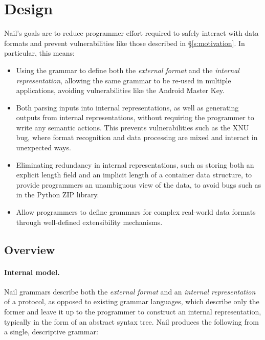 \section{Design}
\label{s:design}

Nail's goals are to reduce programmer effort required to safely interact with data formats and
prevent vulnerabilities like those described in \S\ref{s:motivation}. In particular, this means:

\begin{itemize}


\item Using the grammar to define both the \emph{external format} and the \emph{internal
    representation}, allowing the same grammar to be re-used in multiple applications, avoiding
  vulnerabilities like the Android Master Key.

\item Both parsing inputs into internal representations, as well as
      generating outputs from internal representations, without
      requiring the programmer to write any semantic actions. This prevents
      vulnerabilities such as the XNU bug, where format recognition and data processing
      are mixed and interact in unexpected ways.

\item Eliminating redundancy in internal representations, such as
      storing both an explicit length field and an implicit length
      of a container data structure, to provide programmers
      an unambiguous view of the data, to avoid bugs such as in the Python ZIP library.

\item Allow programmers to define grammars for complex real-world
      data formats through well-defined extensibility mechanisms. 

\end{itemize}

\subsection{Overview}

\paragraph{Internal model.}

Nail grammars describe both the \emph{external format} and an
\emph{internal representation} of a protocol, as opposed to existing
grammar languages, which describe only the former and leave it up to
the programmer to construct an internal representation, typically in
the form of an abstract syntax tree.
Nail produces the following from a single, descriptive grammar: 

